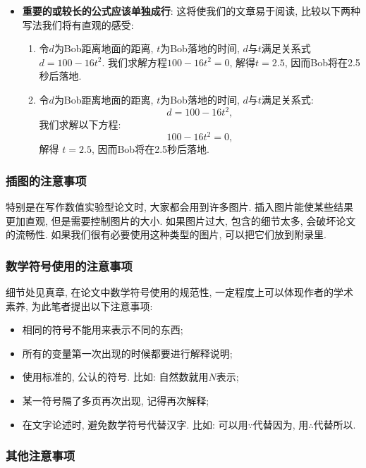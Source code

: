 \documentclass{booki}
\begin{document}
\begin{itemize}
    \item {\textbf{重要的或较长的公式应该单独成行}}: 这将使我们的文章易于阅读, 比较以下两种写法我们将有直观的感受:
          \begin{enumerate}
              \item 令$d$为Bob距离地面的距离, $t$为Bob落地的时间, $d$与$t$满足关系式$d = 100 − 16t^{2}$. 我们求解方程$100 − 16t^{2} = 0$, 解得$t =2.5$, 因而Bob将在2.5秒后落地.
              \item 令$d$为Bob距离地面的距离, $t$为Bob落地的时间, $d$与$t$满足关系式:
                    \begin{equation*}
                        d = 100 − 16t^{2},
                    \end{equation*}
                    我们求解以下方程:
                    \begin{equation*}
                        100 − 16t^{2} =0,
                    \end{equation*}
                    解得 $t =2.5$, 因而Bob将在2.5秒后落地.
          \end{enumerate}
\end{itemize}
\subsubsection{插图的注意事项}


特别是在写作数值实验型论文时, 大家都会用到许多图片. 插入图片能使某些结果更加直观, 但是需要控制图片的大小. 如果图片过大, 包含的细节太多, 会破坏论文的流畅性. 如果我们很有必要使用这种类型的图片, 可以把它们放到附录里.
\subsubsection{数学符号使用的注意事项}


细节处见真章{, 在论文中数学符号使用的规范性, 一定程度上可以体现作者的学术素养}, 为此笔者提出以下注意事项:
\begin{itemize}
    \item 相同的符号不能用来表示不同的东西{;}
    \item 所有的变量第一次出现的时候都要进行解释说明{;}
    \item 使用标准的, 公认的符号. 比如: 自然数就用$N$表示{;}
    \item 某一符号隔了多页再次出现, 记得再次解释{;}
    \item 在文字论述时, 避免数学符号代替汉字. 比如: 可以用$\because$代替因为, 用$\therefore$代替所以{.}
\end{itemize}
\subsubsection{其他注意事项}
\end{document}
